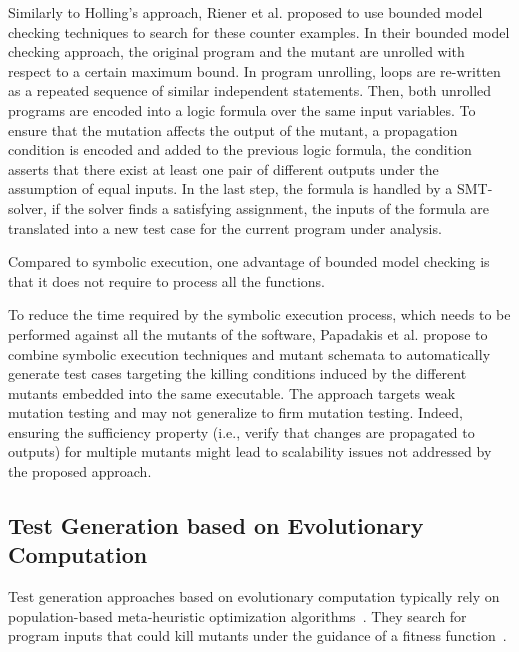 Similarly to Holling's approach, Riener et al. \cite{riener2011test} proposed to use bounded model checking techniques to search for these counter examples.
In their bounded model checking approach, the original program and the mutant are unrolled with respect to a certain maximum bound. In program unrolling, loops are re-written as a repeated sequence of similar independent statements. Then, both unrolled programs are encoded into a logic formula over the same input variables. To ensure that the mutation affects the output of the mutant, a propagation condition is encoded and added to the previous logic formula, the condition asserts that there exist at least one pair of different outputs under the assumption of equal inputs. In the last step, the formula is handled by a SMT-solver, if the solver finds a satisfying assignment, the inputs of the formula are translated into a new test case for the current program under analysis.


Compared to symbolic execution, one advantage of bounded model checking is that it does not require to process all the functions.

To reduce the time required by the symbolic execution process, which needs to be performed against all the mutants of the software, Papadakis et al. \cite{papadakis2011automatically, papadakis2010towards} propose to combine symbolic execution techniques and mutant schemata to automatically generate test cases targeting the killing conditions induced by the different mutants embedded into the same executable. The approach targets weak mutation testing and may not generalize to firm mutation testing. Indeed, ensuring the sufficiency property (i.e., verify that changes are propagated to outputs) for multiple mutants might lead to scalability issues not addressed by the proposed approach.

\subsection{Test Generation based on Evolutionary Computation}

Test generation approaches based on evolutionary computation typically rely on population-based meta-heuristic optimization algorithms~\cite{harman2011strong}. 
They search for program inputs that could kill mutants under the guidance of a fitness function~\cite{harman2011strong}. 


